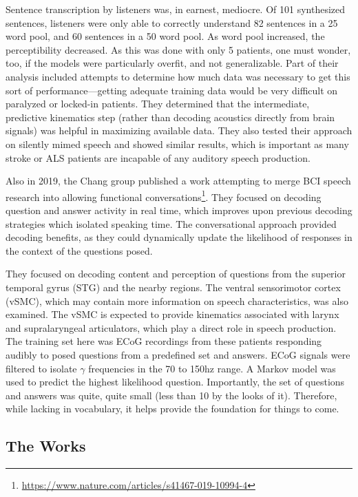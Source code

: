 Sentence transcription by listeners was, in earnest, mediocre. Of 101 synthesized sentences, listeners were only able to correctly understand 82 sentences in a 25 word pool, and 60 sentences in a 50 word pool. As word pool increased, the perceptibility decreased. As this was done with only 5 patients, one must wonder, too, if the models were particularly overfit, and not generalizable. Part of their analysis included attempts to determine how much data was necessary to get this sort of performance---getting adequate training data would be very difficult on paralyzed or locked-in patients. They determined that the intermediate, predictive kinematics step (rather than decoding acoustics directly from brain signals) was helpful in maximizing available data. They also tested their approach on silently mimed speech and showed similar results, which is important as many stroke or ALS patients are incapable of any auditory speech production. \newline

Also in 2019, the Chang group published a work attempting to merge BCI speech research into allowing functional conversations\footnote{\url{https://www.nature.com/articles/s41467-019-10994-4}}. They focused on decoding question and answer activity in real time, which improves upon previous decoding strategies which isolated speaking time. The conversational approach provided decoding benefits, as they could dynamically update the likelihood of responses in the context of the questions posed.\newline

They focused on decoding content and perception of questions from the superior temporal gyrus (STG) and the nearby regions. The ventral sensorimotor cortex (vSMC), which may contain more information on speech characteristics, was also examined. The vSMC is expected to provide kinematics associated with larynx and supralaryngeal articulators, which play a direct role in speech production. The training set here was ECoG recordings from these patients responding audibly to posed questions from a predefined set and answers. ECoG signals were filtered to isolate $\gamma$ frequencies in the 70 to 150hz range. A Markov model was used to predict the highest likelihood question. Importantly, the set of questions and answers was quite, quite small (less than 10 by the looks of it). Therefore, while lacking in vocabulary, it helps provide the foundation for things to come. 

\subsection{The Works}

